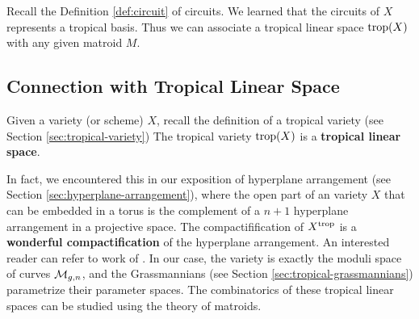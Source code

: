 	    Recall the Definition \ref{def:circuit} of circuits.
	    We learned that the circuits of $X$ 
	    represents a tropical basis.
	    Thus we can associate a tropical linear space $\operatorname{trop}(X)$
	    with any given matroid $M$.
	
	\subsection{Connection with Tropical Linear Space}
	\label{subsec:tropical-linear-space}
	 
	    \begin{definition}
	    \label{def:tropical-linear-space}
	        Given a variety (or scheme) $X$, recall the definition of a tropical variety (see Section \ref{sec:tropical-variety})
	        The tropical variety $\operatorname{trop}(X)$ is a \textbf{tropical linear space}.
	    \end{definition}
	    In fact, we encountered this in our exposition of hyperplane arrangement (see Section \ref{sec:hyperplane-arrangement}),
	    where the open part of an variety $X$ that can be embedded in a torus is the complement of a $n+1$ hyperplane arrangement in a projective space. 
	    The compactifification of $X^{\operatorname{trop}}$ is a \textbf{wonderful compactification} of the hyperplane arrangement.
	    An interested reader can refer to work of \citet{Feichtner2005}.
	    In our case, the variety is exactly the moduli space of curves $\mathcal{M}_{g, n}$,
	    and the Grassmannians (see Section \ref{sec:tropical-grassmannians}) parametrize their parameter spaces. 
	    The combinatorics of these tropical linear spaces can be studied using the theory of matroids. 

